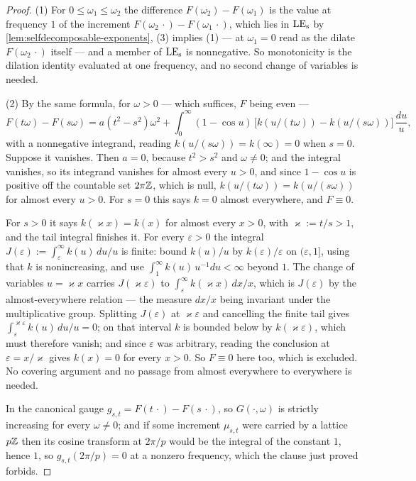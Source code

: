 \begin{proof}
\leanok
(1) For $0 \le \omega_1 \le \omega_2$ the difference $F(\omega_2) - F(\omega_1)$ is the value at
frequency $1$ of the increment $F(\omega_2\,\cdot) - F(\omega_1\,\cdot)$, which lies in $\mathrm{LE}_{\mathrm{s}}$ by
\ref{lem:selfdecomposable-exponents}, (3) implies (1) --- at $\omega_1 = 0$ read as the dilate
$F(\omega_2\,\cdot)$ itself --- and a member of $\mathrm{LE}_{\mathrm{s}}$ is nonnegative. So monotonicity is the
dilation identity evaluated at one frequency, and no second change of variables is needed.

(2) By the same formula, for $\omega > 0$ --- which suffices, $F$ being even ---
\[
  F(t\omega) - F(s\omega)
  = a(t^2-s^2)\omega^2
   + \int_0^\infty (1-\cos u)\,\bigl[k(u/(t\omega)) - k(u/(s\omega))\bigr]\,\frac{du}{u},
\]
with a nonnegative integrand, reading $k(u/(s\omega)) = k(\infty) = 0$ when $s = 0$. Suppose it
vanishes. Then $a = 0$, because $t^2 > s^2$ and $\omega \ne 0$; and the integral vanishes, so
its integrand vanishes for almost every $u > 0$, and since $1 - \cos u$ is positive off the
countable set $2\pi\mathbb{Z}$, which is null, $k(u/(t\omega)) = k(u/(s\omega))$ for almost every
$u > 0$. For $s = 0$ this says $k = 0$ almost everywhere, and $F \equiv 0$.

For $s > 0$ it says $k(\varkappa x) = k(x)$ for almost every $x > 0$, with
$\varkappa := t/s > 1$, and the tail integral finishes it. For every $\varepsilon > 0$ the
integral $J(\varepsilon) := \int_\varepsilon^\infty k(u)\,du/u$ is finite: bound $k(u)/u$ by
$k(\varepsilon)/\varepsilon$ on $(\varepsilon,1]$, using that $k$ is nonincreasing, and use
$\int_1^\infty k(u)\,u^{-1}du < \infty$ beyond $1$. The change of variables $u = \varkappa x$
carries $J(\varkappa\varepsilon)$ to $\int_\varepsilon^\infty k(\varkappa x)\,dx/x$, which is
$J(\varepsilon)$ by the almost-everywhere relation --- the measure $dx/x$ being invariant under
the multiplicative group. Splitting $J(\varepsilon)$ at $\varkappa\varepsilon$ and cancelling
the finite tail gives $\int_\varepsilon^{\varkappa\varepsilon} k(u)\,du/u = 0$; on that interval
$k$ is bounded below by $k(\varkappa\varepsilon)$, which must therefore vanish; and since
$\varepsilon$ was arbitrary, reading the conclusion at $\varepsilon = x/\varkappa$ gives
$k(x) = 0$ for every $x > 0$. So $F \equiv 0$ here too, which is excluded. No covering argument
and no passage from almost everywhere to everywhere is needed.

In the canonical gauge $g_{s,t} = F(t\,\cdot) - F(s\,\cdot)$, so $G(\cdot,\omega)$ is strictly
increasing for every $\omega \ne 0$; and if some increment $\mu_{s,t}$ were carried by a lattice
$p\mathbb{Z}$ then its cosine transform at $2\pi/p$ would be the integral of the constant $1$, hence
$1$, so $g_{s,t}(2\pi/p) = 0$ at a nonzero frequency, which the clause just proved forbids.
\end{proof}

